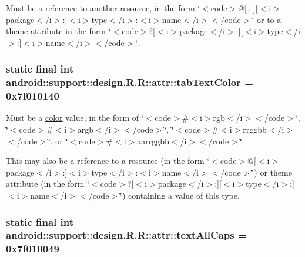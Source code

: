 Must be a reference to another resource, in the form \char`\"{}$<$code$>$@\mbox{[}+\mbox{]}\mbox{[}$<$i$>$package$<$/i$>$:\mbox{]}$<$i$>$type$<$/i$>$:$<$i$>$name$<$/i$>$$<$/code$>$\char`\"{} or to a theme attribute in the form \char`\"{}$<$code$>$?\mbox{[}$<$i$>$package$<$/i$>$:\mbox{]}\mbox{[}$<$i$>$type$<$/i$>$:\mbox{]}$<$i$>$name$<$/i$>$$<$/code$>$\char`\"{}. \hypertarget{classandroid_1_1support_1_1design_1_1_r_1_1attr_17edcd98399eb28e6cf2600a4c0012f3}{
\subsubsection[{tabTextColor}]{\setlength{\rightskip}{0pt plus 5cm}static final int android::support::design.R.R::attr::tabTextColor = 0x7f010140}}
\label{classandroid_1_1support_1_1design_1_1_r_1_1attr_17edcd98399eb28e6cf2600a4c0012f3}


Must be a \hyperlink{classandroid_1_1support_1_1design_1_1_r_1_1color}{color} value, in the form of \char`\"{}$<$code$>$\#$<$i$>$rgb$<$/i$>$$<$/code$>$\char`\"{}, \char`\"{}$<$code$>$\#$<$i$>$argb$<$/i$>$$<$/code$>$\char`\"{}, \char`\"{}$<$code$>$\#$<$i$>$rrggbb$<$/i$>$$<$/code$>$\char`\"{}, or \char`\"{}$<$code$>$\#$<$i$>$aarrggbb$<$/i$>$$<$/code$>$\char`\"{}. 

This may also be a reference to a resource (in the form \char`\"{}$<$code$>$@\mbox{[}$<$i$>$package$<$/i$>$:\mbox{]}$<$i$>$type$<$/i$>$:$<$i$>$name$<$/i$>$$<$/code$>$\char`\"{}) or theme attribute (in the form \char`\"{}$<$code$>$?\mbox{[}$<$i$>$package$<$/i$>$:\mbox{]}\mbox{[}$<$i$>$type$<$/i$>$:\mbox{]}$<$i$>$name$<$/i$>$$<$/code$>$\char`\"{}) containing a value of this type. \hypertarget{classandroid_1_1support_1_1design_1_1_r_1_1attr_34f775ff6163dda8f9d6866c27bd63db}{
\subsubsection[{textAllCaps}]{\setlength{\rightskip}{0pt plus 5cm}static final int android::support::design.R.R::attr::textAllCaps = 0x7f010049}}
\label{classandroid_1_1support_1_1design_1_1_r_1_1attr_34f775ff6163dda8f9d6866c27bd63db}


